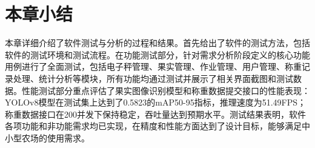 
\section{本章小结}

本章详细介绍了软件测试与分析的过程和结果。首先给出了软件的测试方法，包括软件的测试环境和测试流程。在功能测试部分，针对需求分析阶段定义的核心功能用例进行了全面测试，包括电子秤管理、果实管理、作业管理、用户管理、称重记录处理、统计分析等模块，所有功能均通过测试并展示了相关界面截图和测试数据。性能测试部分重点评估了果实图像识别模型和称重数据提交接口的性能表现：YOLOv8模型在测试集上达到了0.5823的mAP50-95指标，推理速度为51.49FPS；称重数据接口在200并发下保持稳定，吞吐量达到预期水平。测试结果表明，软件各项功能和非功能需求均已实现，在精度和性能方面达到了设计目标，能够满足中小型农场的使用需求。
